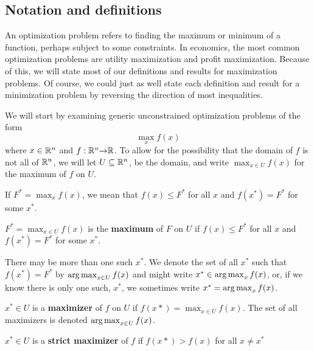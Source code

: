 \subsection{Notation and definitions}
An optimization problem refers to finding the maximum or minimum of a
function, perhaps subject to some constraints. In economics, the most
common optimization problems are utility maximization and profit
maximization. Because of this, we will state most of our definitions
and results for maximization problems. Of course, we could just as
well state each definition and result for a minimization problem by
reversing the direction of most inequalities.

We will start by examining generic unconstrained optimization problems
of the form
\[ \max_{x} f(x) \] 
where $x \in \mathbb{R}^n$ and $f:\mathbb{R}^n {\rightarrow} \mathbb{R}$. To allow for the possibility
that the domain of $f$ is not all of $\mathbb{R}^n$, we will let $U \subseteq
\mathbb{R}^n$, be the domain, and write $\max_{x \in U} f(x)$ for the maximum
of $f$ on $U$. 

If $F^* = \max_{x} f(x)$, we mean that $f(x) \leq F^*$ for all $x$ and
$f(x^*) = F^*$ for some $x^*$.
\begin{definition}\label{d:max}
  $F^* = \max_{x \in U} f(x)$ is the \textbf{maximum} of $F$ on $U$ if
  $f(x) \leq F^*$ for all $x$ and $f(x^*) = F^*$ for some $x^*$.
\end{definition}
There may be more than one such $x^*$. We denote the set of all $x^*$
such that $f(x^*) = F^*$ by $\argmax_{x \in U} f(x)$ and might write
$x^* \in \argmax_{x} f(x)$, or, if we know there is only one
such, $x^*$, we sometimes write $x^* = \argmax_{x} f(x)$.
\begin{definition} \label{d:maxer}
  $x^* \in U$ is a \textbf{maximizer} of $f$ on $U$ if $f(x*)
  = \max_{x \in U} 
  f(x)$. The set of all maximizers is denoted $\argmax_{x \in U}
  f(x)$.
\end{definition}
\begin{definition}\label{d:smaxer}
  $x^* \in U$ is a \textbf{strict maximizer} of $f$ if $f(x*) > f(x)
  $ for all $x \neq x^*$
\end{definition}

